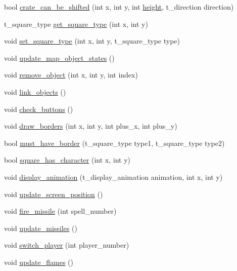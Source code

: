 \begin{DoxyCompactItemize}
\item 
bool \hyperlink{classc__map_a7ed031ff3dbd23f042273180f5f0abfb}{crate\-\_\-can\-\_\-be\-\_\-shifted} (int x, int y, int \hyperlink{classc__map_af30ddc07f94cbc2e9c91cbdfd3f68cc5}{height}, t\-\_\-direction direction)
\item 
t\-\_\-square\-\_\-type \hyperlink{classc__map_a876a3d275b3d88e3106d7af62c823774}{get\-\_\-square\-\_\-type} (int x, int y)
\item 
void \hyperlink{classc__map_a2d6baf17ed853fc872da4adafe956426}{set\-\_\-square\-\_\-type} (int x, int y, t\-\_\-square\-\_\-type type)
\item 
void \hyperlink{classc__map_a3c30d1f9254e0aeb71e2859d7e879e72}{update\-\_\-map\-\_\-object\-\_\-states} ()
\item 
void \hyperlink{classc__map_a4033258ab06d0867efb3cf534cf8b93f}{remove\-\_\-object} (int x, int y, int index)
\item 
void \hyperlink{classc__map_ae840e8935d33f10baf479a4ff7f10c27}{link\-\_\-objects} ()
\item 
void \hyperlink{classc__map_ad0732462db74b1bc531196b2d1247809}{check\-\_\-buttons} ()
\item 
void \hyperlink{classc__map_a64d2a8dd8dd79eb92c6ff2d087907369}{draw\-\_\-borders} (int x, int y, int plus\-\_\-x, int plus\-\_\-y)
\item 
bool \hyperlink{classc__map_a798709905b72d00d95940b78e5c7cabc}{must\-\_\-have\-\_\-border} (t\-\_\-square\-\_\-type type1, t\-\_\-square\-\_\-type type2)
\item 
bool \hyperlink{classc__map_a0a382a09197490bc1557bf64745db261}{square\-\_\-has\-\_\-character} (int x, int y)
\item 
void \hyperlink{classc__map_a1a60a7de987db9e2dd88672f19890cb3}{display\-\_\-animation} (t\-\_\-display\-\_\-animation animation, int x, int y)
\item 
void \hyperlink{classc__map_a706ea8f6dffb4881bee80f97e12d611b}{update\-\_\-screen\-\_\-position} ()
\item 
void \hyperlink{classc__map_ac589863287ad3ab09d3766f39da6fd09}{fire\-\_\-missile} (int spell\-\_\-number)
\item 
void \hyperlink{classc__map_a0a72be4c098a468e7c3737230027eb4d}{update\-\_\-missiles} ()
\item 
void \hyperlink{classc__map_afd7f4e6c58a622b83580d236397530a3}{switch\-\_\-player} (int player\-\_\-number)
\item 
void \hyperlink{classc__map_a0f0fdbcf0a83552527eae22a098b6fd4}{update\-\_\-flames} ()

\end{DoxyCompactItemize}
